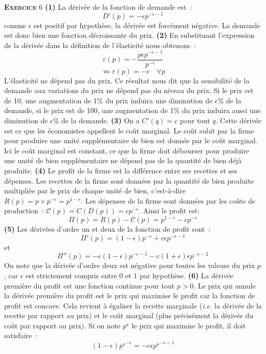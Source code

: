 \documentclass[10pt,a4paper,notitlepage]{article}
\newcommand{\exercice}[1]{\textsc{\textbf{Exercice}} #1}
\begin{document}
\exercice{6} \textbf{(1)} La dérivée de la fonction de demande est :
\[
D'(p) = -\epsilon p^{-\epsilon-1}
\]
comme $\epsilon$ est positif par hypothèse, la dérivée est forcément négative. La demande est donc bien une fonction décroissante du prix. \textbf{(2)} En substituant l'expression de la dérivée dans la définition de l'élasticité nous obtenons :
\[
\varepsilon (p) = -\frac{p \epsilon p^{-\epsilon-1}}{p^{-\epsilon}}
\]
\[
\Leftrightarrow \varepsilon (p) = -\epsilon\quad\forall p
\]
L'élasticité ne dépend pas du prix. Ce résultat nous dit que la
sensibilité de la demande aux variations du prix ne dépend pas du
niveau du prix. Si le prix est de 10, une augmentation de 1\% du prix
induira une diminution de $\epsilon$\% de la demande, si le prix est
de 100, une augmentation de 1\% du prix induira aussi une diminution
de $\epsilon$\% de la demande. \textbf{(3)} On a $C'(q) = c$ pour tout
$q$. Cette dérivée est ce que les économistes appellent le coût
marginal. Le coût subit par la firme pour produire une unité
supplémentaire de bien est donnée par le coût marginal. Ici le coût
marginal est constant, ce que la firme doit débourser pour produire
une unité de bien supplémentaire ne dépend pas de la quantité de bien
déjà produite. \textbf{(4)} Le profit de la firme est la différence
entre ses recettes et ses dépenses. Les recettes de la firme sont
données par la quantité de bien produite multipliée par le prix de
chaque unité de bien, c'est-à-dire
$R(p) = p\times p^{-\epsilon} = p^{1-\epsilon}$. Les dépenses de la
firme sont données par les coûts de production :
$\mathcal C(p) = C(D(p)) = c p^{-\epsilon}$. Ainsi le profit est:
\[
\Pi(p) = R(p)-\mathcal C(p) = p^{1-\epsilon} - c p^{-\epsilon} 
\]
\textbf{(5)} Les dérivées d'ordre un et deux de la fonction de profit sont :
\[
\Pi'(p) = (1-\epsilon)p^{-\epsilon} + c \epsilon p^{-\epsilon-1}
\]
et
\[
\Pi''(p) = -\epsilon(1-\epsilon)p^{-\epsilon-1} - c(1+\epsilon) \epsilon p^{-\epsilon-2}
\]
On note que la dérivée d'ordre deux est négative pour toutes les
valeurs du prix $p$, car $\epsilon$ est strictement compris entre 0 et
1 par hypothèse. \textbf{(6)} La dérivée première du profit est une
fonction continue pour tout $p>0$. Le prix qui annule la dérivée
première du profit est le prix qui maximise le profit car la fonction
de profit est concave. Cela revient à égaliser la recette marginale
(\emph{i.e.} la dérivée de la recette par rapport au prix) et le coût
marginal (plus précisément la dérivée du coût par rapport au prix). Si
on note $p^{\star}$ le prix qui maximise le profit, il doit
satisfaire :
\[
  (1-\epsilon){p^{\star}}^{-\epsilon} = - c \epsilon {p^{\star}}^{-\epsilon-1}
\]
\end{document}
